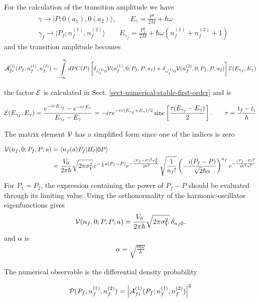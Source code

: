 For the calculation of the transition amplitude we have
\begin{align}
  &\gamma\rightarrow |P;0(a_1),0(a_2)\rangle,\qquad E_\gamma = \frac{P^2}{2M}+\hbar\omega\\
  & \gamma_f\rightarrow|P_f;n_f^{(1)},n_f^{(2)}\rangle\qquad E_{\gamma_f} = \frac{P_f^2}{2M}+\hbar\omega(n_f^{(1)}+n_f^{(2)}+1)
\end{align}
and the transition amplitude becomes
\begin{importantbox}
  \begin{align}
    {\cal A}_{fi}^{(1)} (P_f;n_f^{(1)},n_f^{(2)})= \int\limits_{-\infty}^{\infty}dPC(P)\left[\delta_{n_f^{(2)}0}{\cal V}(n_f^{(1)},0;P_f,P;a_1)+\delta_{n_f^{(1)}0}{\cal V}(n_f^{(2)},0; P_f,P;a_2)\right] {\cal E}(E_{\gamma_f},E_\gamma)
  \end{align}
\end{importantbox}
the factor ${\cal E}$ is calculated in Sect. \ref{sect-numerical-stable-first-order} and is
\begin{importantbox}
  \begin{align} {\cal E}(E_{\gamma_f},E_\gamma)=\frac{e^{-i\tau E_{\gamma_f}}-e^{-i\tau E_\gamma}}{E_{\gamma_f}-E_\gamma} = -i\tau
    e^{-i\tau(E_{\gamma_f}+E_\gamma)/2}        \operatorname{sinc} \left[
      \frac{\tau(E_{\gamma_f}-E_{\gamma})}{2}
    \right].\qquad \tau = \frac{t_f-t_i}{\hbar}\label{regularized-E-used}
  \end{align}
\end{importantbox}

The matrix element $ {\cal V}$ has a simplified form since one of the indices is zero
\begin{importantbox}
  \begin{align}
    {\cal V}(n_f,0;P_f,P;a)&= \langle n_f(a) P_f|H_I|0 P\rangle  \nonumber\\
    &= \frac{V_0}{2\pi\hbar}\sqrt{{2\pi\sigma_V^2}} e^{-\frac{i}{\hbar}a(P_f-P)}e^{-\frac{(P_f-P)^2\sigma_V^2}{2\hbar^2}}\sqrt{\frac{1}{n_f!}} \left(-\frac{i (P_f-P)  }{\sqrt{2}\hbar\alpha}\right)^{n_f} e^{-\frac{(P_f-P)^2 }{4\hbar^2\alpha^2}} \label{cal-V_n1n2p1p2-use-n0}
  \end{align}
  For $P_1=P_2$, the expression containing the power of $P_f-P$
  should be evaluated through its limiting value.  Using the
  orthonormality of the harmonic-oscillator eigenfunctions gives
  \begin{align}
    {\cal V}(n_f,0;P,P;a)
    = \frac{V_0}{2\pi\hbar}\sqrt{2\pi\sigma_V^2}\,
    \delta_{n_f0}.\label{cal-V_n1n2p1p2-spec-use-n0}
  \end{align}
  and $\alpha$ is
  \begin{align}
    \alpha=\sqrt{\frac{m\omega}\hbar}
  \end{align}
\end{importantbox}
The numerical observable is the differential density probability
\begin{importantbox}
  \begin{align}
    {\cal P}(P_f, n_f^{(1)}, n_f^{(2)}) = \left|{\cal A}_{fi}^{(1)} (P_f;n_f^{(1)},n_f^{(2)})\right|^2
  \end{align}
\end{importantbox}


